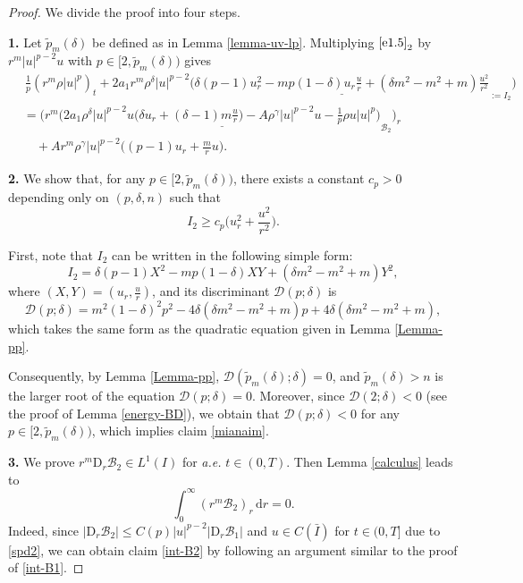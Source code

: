 \documentclass[11pt,reqno]{amsart}
\numberwithin{rk}{section}
\numberwithin{prop}{section}
\numberwithin{mydef}{section}
\numberwithin{lem}{section}
\numberwithin{equation}{section}
\numberwithin{thm}{section}
\begin{document}
\begin{proof}
We divide the proof into four steps.

\smallskip
\textbf{1.} Let $\tilde{p}_{m}(\delta)$ be defined as in Lemma \ref{lemma-uv-lp}. Multiplying $\eqref{e1.5}_2$ by $r^m|u|^{p-2}u$ with $p\in [2,\tilde{p}_{m}(\delta))$ gives
\begin{equation}\label{4.17}
\begin{aligned}
&\,\frac{1}{p}(r^m\rho |u|^p)_t+2a_1 r^m \rho^\delta |u|^{p-2}\Big(\underline{\delta(p-1)u_r^2-mp(1-\delta)u_r\frac{u}{r}+(\delta m^2-m^2+m)\frac{u^2}{r^2}}_{:=I_2}\Big)\\
&=\Big(r^m\big(\underline{2a_1 \rho^\delta|u|^{p-2}u\big(\delta u_r+(\delta-1)m\frac{u}{r}\big)-A \rho^\gamma |u|^{p-2}u -\frac{1}{p} \rho u|u|^p\big)}_{\mathcal{B}_2}\Big)_r\\
&\quad +Ar^m\rho^\gamma |u|^{p-2}\big((p-1)u_r+\frac{m}{r}u\big).
\end{aligned}
\end{equation}

\smallskip
\textbf{2.} We show that, for any $p\in [2,\tilde{p}_{m}(\delta))$, there exists a constant $c_p>0$ depending only on $(p,\delta,n)$ such that
\begin{equation}\label{mianaim}
I_2\geq c_p \big(u_r^2+ \frac{u^2}{r^2}\big).
\end{equation}


First, note that $I_2$ can be written in the following simple form:
\begin{equation*} 
I_2=\delta(p-1)X^2-mp(1-\delta)XY+(\delta m^2-m^2+m)Y^2,
\end{equation*}
where $(X,Y)=(u_r,\frac{u}{r})$, and its discriminant $\mathscr{D}(p;\delta)$ is  
\begin{equation*}
\mathscr{D}(p;\delta)=m^2(1-\delta)^2p^2-4\delta(\delta m^2-m^2+m)p+4\delta(\delta m^2-m^2+m),
\end{equation*}
which takes the same form as the quadratic equation given in Lemma \ref{Lemma-pp}. 

Consequently, by Lemma \ref{Lemma-pp}, $\mathscr{D}(\tilde{p}_m(\delta);\delta)=0$, and $\tilde{p}_m(\delta)>n$ is the larger root of the equation $\mathscr{D}(p;\delta)=0$. Moreover, since $\mathscr{D}(2;\delta)<0$ (see the proof of Lemma \ref{energy-BD}),  
we obtain that $\mathscr{D}(p;\delta)<0$ for any $p\in [2,\tilde{p}_m(\delta))$, which implies claim \eqref{mianaim}.


\smallskip
\textbf{3.} We prove $r^m\mathrm{D}_r\mathcal{B}_2 \in L^1(I)$ for \textit{a.e.} $t\in (0,T)$. Then Lemma \ref{calculus} leads to 
\begin{equation}\label{int-B2}
\int_0^\infty (r^m\mathcal{B}_2)_r\,\mathrm{d}r =0.
\end{equation}
Indeed, since $|\mathrm{D}_r\mathcal{B}_2|\leq C(p)|u|^{p-2}|\mathrm{D}_r\mathcal{B}_1|$ and $u\in C(\bar I)$ for $t\in (0,T]$ due to \eqref{spd2}, we can obtain claim \eqref{int-B2} by following an argument similar to the proof of \eqref{int-B1}.



\end{proof}
\end{document}

